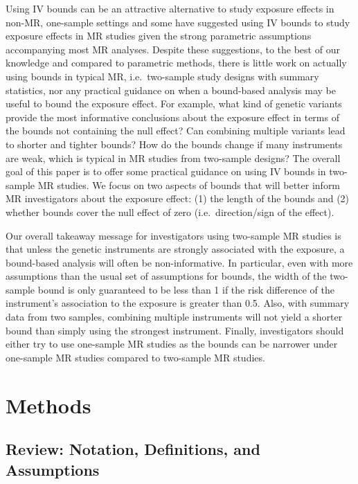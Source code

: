 \documentclass[AMA,STIX1COL,]{WileyNJD-v2}
\begin{document}
Using IV bounds can be an attractive alternative to study exposure
effects in non-MR, one-sample settings
\citep{swanson_commentary_2013, swanson_partial_2018} and some
\citep{didelez_mendelian_2007, swanson_commentary_2017} have suggested
using IV bounds to study exposure effects in MR studies given the strong
parametric assumptions accompanying most MR analyses. Despite these
suggestions, to the best of our knowledge and compared to parametric
methods, there is little work on actually using bounds in typical MR,
i.e.~two-sample study designs with summary statistics, nor any practical
guidance on when a bound-based analysis may be useful to bound the
exposure effect. For example, what kind of genetic variants provide the
most informative conclusions about the exposure effect in terms of the
bounds not containing the null effect? Can combining multiple variants
lead to shorter and tighter bounds? How do the bounds change if many
instruments are weak, which is typical in MR studies from two-sample
designs? The overall goal of this paper is to offer some practical
guidance on using IV bounds in two-sample MR studies. We focus on two
aspects of bounds that will better inform MR investigators about the
exposure effect: (1) the length of the bounds and (2) whether bounds
cover the null effect of zero (i.e.~direction/sign of the effect).

Our overall takeaway message for investigators using two-sample MR
studies is that unless the genetic instruments are strongly associated
with the exposure, a bound-based analysis will often be non-informative.
In particular, even with more assumptions than the usual set of
assumptions for bounds, the width of the two-sample bound is only
guaranteed to be less than 1 if the risk difference of the instrument's
association to the exposure is greater than 0.5. Also, with summary data
from two samples, combining multiple instruments will not yield a
shorter bound than simply using the strongest instrument. Finally,
investigators should either try to use one-sample MR studies as the
bounds can be narrower under one-sample MR studies compared to
two-sample MR studies.

\hypertarget{methods}{%
\section{Methods}\label{methods}}

\label{setup}

\hypertarget{review-notation-definitions-and-assumptions}{%
\subsection{Review: Notation, Definitions, and
Assumptions}\label{review-notation-definitions-and-assumptions}}
\end{document}

